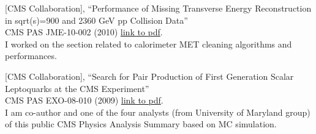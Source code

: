 \documentclass[10pt, a4paper]{article}
\begin{document}
\begin{thebibliography}{599}
  

[CMS Collaboration],
``Performance of Missing Transverse Energy Reconstruction in sqrt(s)=900 and 2360 GeV pp Collision Data''\\
  CMS PAS JME-10-002 (2010)
  \href{http://cdsweb.cern.ch/record/1247385/files/JME-10-002-pas.pdf}{link
  to pdf}.
  \\ I worked on the section related to calorimeter MET cleaning algorithms and performances.

[CMS Collaboration],
``Search for Pair Production of First Generation Scalar Leptoquarks at the CMS Experiment''\\
  CMS PAS EXO-08-010 (2009)
  \href{http://cdsweb.cern.ch/record/1196076/files/EXO-08-010-pas.pdf}{link
  to pdf}.
  \\I am co-author and one of the four analysts (from University of Maryland group) of this public CMS Physics Analysis Summary based on MC simulation.
  

\end{thebibliography}
\end{document}
